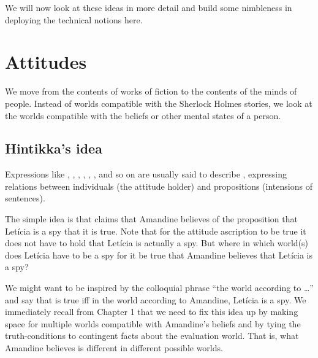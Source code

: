 We will now look at these ideas in more detail and build some nimbleness in
deploying the technical notions here.

\section{Attitudes}
\label{sec:attitudes}

We move from the contents of works of fiction to the contents of the minds of
people. Instead of worlds compatible with the Sherlock Holmes stories, we look
at the worlds compatible with the beliefs or other mental states of a person.

\subsection{Hintikka's idea}
\label{subsec:hintikka}

%
Expressions like , , ,
, , , and so on are
usually said to describe , expressing relations
between individuals (the attitude holder) and propositions (intensions of
sentences).

%
The simple idea is that 
claims that Amandine believes of the proposition that Letícia is a spy that it
is true. Note that for the attitude ascription to be true it does not have to
hold that Letícia is actually a spy. But where \dash in which world(s) \dash
does Letícia have to be a spy for it be true that Amandine believes that Letícia
is a spy?

%
We might want to be inspired by the colloquial phrase ``the world according to
\dots'' and say that  is
true iff in the world according to Amandine, Letícia is a spy. We immediately
recall from Chapter 1 that we need to fix this idea up by making space for
multiple worlds compatible with Amandine's beliefs and by tying the
truth-conditions to contingent facts about the evaluation world. That is, what
Amandine believes is different in different possible worlds.

